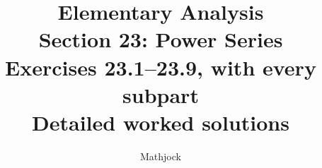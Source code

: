 
\title{\textbf{Elementary Analysis}\\[0.3em]
Section 23: Power Series\\[0.4em]
\large Exercises 23.1--23.9, with every subpart\\
Detailed worked solutions}
\author{Mathjock}
\date{}

\maketitle
\bookinfo
\tableofcontents
\clearpage
\setcounter{section}{22}



